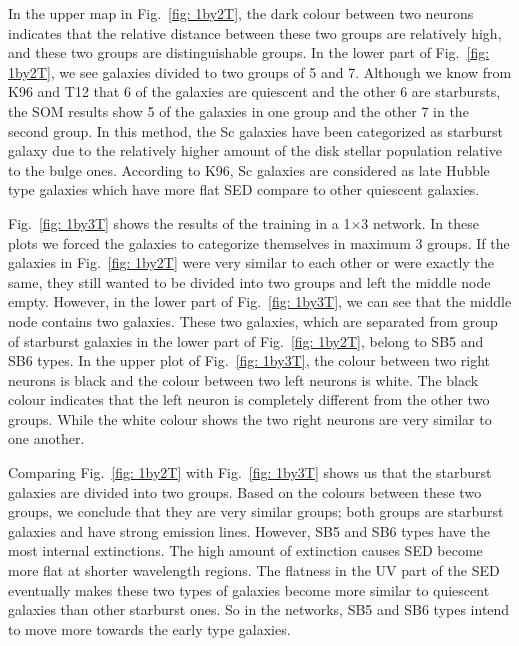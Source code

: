 \documentclass[useAMS,usenatbib]{mn2e}
\begin{document}
        
            In the upper map in Fig.~\ref{fig: 1by2T}, the dark colour between two neurons indicates that the relative distance between these two groups are relatively high, and these two groups are distinguishable groups.
            In the lower part of Fig.~\ref{fig: 1by2T}, we see galaxies divided to two groups of 5 and 7.
            Although we know from K96 and T12 that 6 of the galaxies are quiescent and the other 6 are starbursts, the SOM results show 5 of the galaxies in one group and the other 7 in the second group.
            In this method, the Sc galaxies have been categorized as starburst galaxy due to the relatively higher amount of the disk stellar population relative to the bulge ones. 
            According to K96, Sc galaxies are considered as late Hubble type galaxies which have more flat SED compare to other quiescent galaxies. 
            

            Fig.~\ref{fig: 1by3T} shows the results of the training in a 1$\times$3 network.
            In these plots we forced the galaxies to categorize themselves in maximum 3 groups. 
            If the galaxies in Fig.~\ref{fig: 1by2T} were very similar to each other or were exactly the same, they still wanted to be divided into two groups and left the middle node empty. 
            However, in the lower part of Fig.~\ref{fig: 1by3T}, we can see that the middle node contains two galaxies.
            These two galaxies, which are separated from group of starburst galaxies in the lower part of Fig.~\ref{fig: 1by2T}, belong to SB5 and SB6 types.
            In the upper plot of Fig.~\ref{fig: 1by3T}, the colour between two right neurons is black and the colour between two left neurons is white. 
            The black colour indicates that the left neuron is completely different from the other two groups.
            While the white colour shows the two right neurons are very similar to one another. 
            
            Comparing Fig.~\ref{fig: 1by2T} with Fig.~\ref{fig: 1by3T} shows us that the starburst galaxies are divided into two groups. 
            Based on the colours between these two groups, we conclude that they are very similar groups; both groups are starburst galaxies and have strong emission lines.
            However, SB5 and SB6 types have the most internal extinctions.
            The high amount of extinction causes SED become more flat at shorter wavelength regions.
            The flatness in the UV part of the SED eventually makes these two types of galaxies become more similar to quiescent galaxies than other starburst ones.
            So in the networks, SB5 and SB6 types intend to move more towards the early type galaxies.
                
\end{document}

